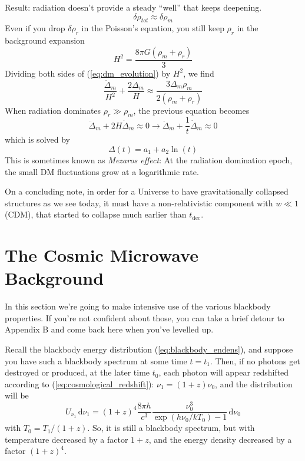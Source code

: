 \par Result: radiation doesn’t provide a steady “well” that keeps deepening.
\begin{equation*}
    \delta\rho_{tot} \approx \delta\rho_{m}
\end{equation*}
Even if you drop $\delta\rho_{r}$ in the Poisson's equation, you still keep $\rho_{r}$ in the background expansion
\begin{equation*}
    H^{2} = \frac{8\pi G(\rho_{m}+\rho_{r})}{3}
\end{equation*}
Dividing both sides of (\ref{eq:dm_evolution}) by $H^{2}$, we find
\begin{equation*}
    \frac{\ddot{\Delta}_{m}}{H^{2}}+\frac{2\dot{\Delta}_{m}}{H}\approx \frac{3\Delta_{m}\rho_{m}}{2(\rho_{m}+\rho_{r})}
\end{equation*}
When radiation dominates $\rho_{r}\gg \rho_{m}$, the previous equation becomes
\begin{equation*}
    \ddot{\Delta}_{m}+2H\dot{\Delta}_{m} \approx 0 \to  \ddot{\Delta}_{m}+\frac{1}{t}\dot{\Delta}_{m} \approx 0
\end{equation*}
which is solved by
\begin{equation}
    \Delta(t) = a_{1} + a_{2}\ln(t)
    \label{eq:mezaroseffect}
\end{equation}
This is sometimes known as \emph{Mezaros effect}: At the radiation domination epoch, the small DM fluctuations grow at a logarithmic rate.
\par On a concluding note, in order for a Universe to have gravitationally collapsed structures as we see today, it must have a non-relativistic
component with $w \ll 1$ (CDM), that started to collapse much earlier than $t_{\text{dec}}$.

\section{The Cosmic Microwave Background}

\par In this section we're going to make intensive use of the various blackbody properties. If you're not confident about those, you can take a brief detour to Appendix B and come back here when you've levelled up.
\par Recall the blackbody energy distribution (\ref{eq:blackbody_endens}), and suppose you have such a blackbody spectrum at some time $t = t_{1}$. Then, if no photons get destroyed or produced, at the later time $t_{0}$, each photon will appear redshifted according to (\ref{eq:cosmological_redshift}): $\nu_{1} = (1+z)\nu_{0}$, and the distribution will be
\begin{equation}
    U_{\nu_{1}}\,\text{d}\nu_{1} = (1+z)^{4}\frac{8\pi h}{c^{3}}\frac{\nu_{0}^{3}}{\exp(h\nu_{0}/kT_{0})-1}\,\text{d}\nu_{0}
    \label{eq:blackbody_redshift}
\end{equation}
with $T_{0} = T_{1}/(1+z)$. So, it is still a blackbody spectrum, but with temperature decreased by a factor $1 + z$, and the energy density decreased by a factor $(1 + z)^{4}$.

